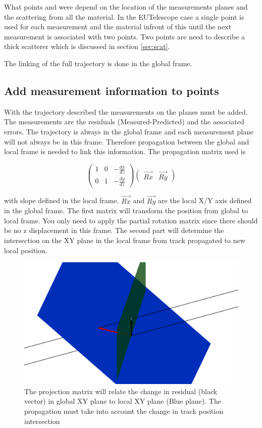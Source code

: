What points and were depend on the location of the measurements planes and the scattering from all the material. In the EUTelescope case a single point is used for each measurement and the material infront of this until the next measurement is associated with two points. Two points are need to describe a thick scatterer which is discussed in section \ref{sec:scat}.

The linking of the full trajectory is done in the global frame.

\subsection{Add measurement information to points}

With the trajectory described the measurements on the planes must be added. The measurements are the residuals (Measured-Predicted) and the associated errors. The trajectory is always in the global frame and each measurement plane will not always be in this frame. Therefore propagation between the global and local frame is needed to link this information.
The propagation matrix used is

\[ 
\left( \begin{array}{ccc}
1  & 0   & -\frac{dx}{dz}   \\
0   & 1  & -\frac{dy}{dz}  
  \label{eq:prop}
\end{array}
 \right)
  \left( \begin{array}{cc}
 \overrightarrow{Rx}  &  \overrightarrow{Ry}  
\end{array}
 \right)
 \] 
 
 with slope defined in the local frame.  $\overrightarrow{Rx}$ and  $\overrightarrow{Ry}$ are the local X/Y axis defined in the global frame. The first matrix will transform the position from global to local frame. You only need to apply the partial rotation matrix since there should be no z displacement in this frame. The second part will determine the intersection on the XY plane in the local frame from track propagated to new local position.
 
 \begin{figure}[H]
\centering
\includegraphics[width=1.0\linewidth]{figures/prop.png}
\caption{The projection matrix will relate the change in residual (black vector) in global XY plane to local XY plane (Blue plane). The propagation must take into account the change in track position intersection   }
\label{fig:Prop}
\end{figure}
 
